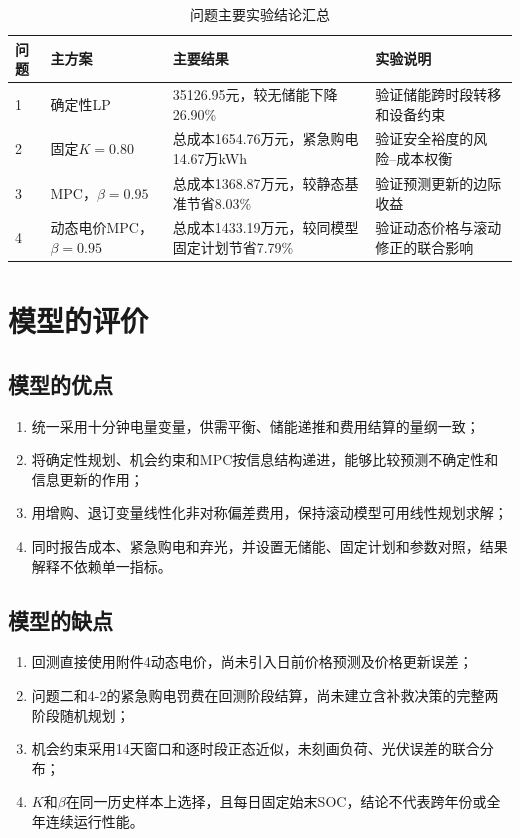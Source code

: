 \documentclass{cumcmthesis}
\begin{document}
\begin{table}[H]
\centering
\small
\setlength{\tabcolsep}{4.5pt}
\renewcommand\arraystretch{1.25}
\caption{问题主要实验结论汇总}
\label{tab:overallresult}
\begin{tabular}{p{1.0cm}p{2.8cm}p{4.1cm}p{4.1cm}}
\toprule
\textbf{问题} & \textbf{主方案} & \textbf{主要结果} & \textbf{实验说明}\\
\midrule
1 & 确定性LP
& 35126.95元，较无储能下降26.90\%
& 验证储能跨时段转移和设备约束\\

2 & 固定$K=0.80$
& 总成本1654.76万元，紧急购电14.67万kWh
& 验证安全裕度的风险--成本权衡\\

3 & MPC，$\beta=0.95$
& 总成本1368.87万元，较静态基准节省8.03\%
& 验证预测更新的边际收益\\

4 & 动态电价MPC，$\beta=0.95$
& 总成本1433.19万元，较同模型固定计划节省7.79\%
& 验证动态价格与滚动修正的联合影响\\
\bottomrule
\end{tabular}
\end{table}

\section{模型的评价}

\subsection{模型的优点}

\begin{enumerate}
    \item 统一采用十分钟电量变量，供需平衡、储能递推和费用结算的量纲一致；
    \item 将确定性规划、机会约束和MPC按信息结构递进，能够比较预测不确定性和信息更新的作用；
    \item 用增购、退订变量线性化非对称偏差费用，保持滚动模型可用线性规划求解；
    \item 同时报告成本、紧急购电和弃光，并设置无储能、固定计划和参数对照，结果解释不依赖单一指标。
\end{enumerate}

\subsection{模型的缺点}

\begin{enumerate}
    \item 回测直接使用附件4动态电价，尚未引入日前价格预测及价格更新误差；
    \item 问题二和4-2的紧急购电罚费在回测阶段结算，尚未建立含补救决策的完整两阶段随机规划；
    \item 机会约束采用14天窗口和逐时段正态近似，未刻画负荷、光伏误差的联合分布；
    \item $K$和$\beta$在同一历史样本上选择，且每日固定始末SOC，结论不代表跨年份或全年连续运行性能。
\end{enumerate}
\end{document}

